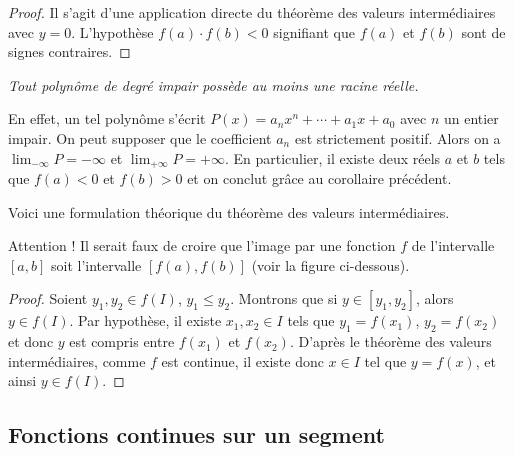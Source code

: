 \documentclass[class=report,crop=false]{standalone}
\begin{document}


\begin{proof}
Il s'agit d'une application directe du théorème des valeurs intermédiaires avec $y=0$.
L'hypothèse $f(a)\cdot f(b)<0$ signifiant que $f(a)$ et $f(b)$ sont de signes contraires.
\end{proof}

\begin{exemple}
\emph{Tout polynôme de degré impair possède au moins une racine réelle.}



En effet, un tel polynôme s'écrit $P(x)=a_nx^n+\cdots+a_1x+a_0$ avec $n$ un entier impair.
On peut supposer que le coefficient $a_n$ est strictement positif. Alors on a
$\displaystyle\lim_{-\infty} P = -\infty$ et $\displaystyle\lim_{+\infty} P = +\infty$.
En particulier, il existe deux réels $a$ et $b$ tels que $f(a)<0$ et $f(b)>0$ et
on conclut grâce au corollaire précédent.
\end{exemple}

Voici une formulation théorique du théorème des valeurs intermédiaires.
\begin{corollaire}\sauteligne
{}
\end{corollaire}

Attention ! Il serait faux de croire que l'image par une fonction $f$ de l'intervalle $[a,b]$
soit l'intervalle $[f(a),f(b)]$ (voir la figure ci-dessous).


\begin{proof}
Soient $y_1,y_2\in f(I)$, $y_1\leq y_2$. Montrons que si $y\in[y_1,y_2]$, alors $y\in f(I)$.
Par hypothèse, il existe $x_1,x_2\in I$ tels que $y_1 =f(x_1)$, $y_2 =f(x_2)$ et donc $y$
est compris entre $f(x_1)$ et $f(x_2)$. D'après le théorème des valeurs intermédiaires,
comme $f$ est continue, il existe donc $x\in I$ tel que $y=f(x)$, et ainsi $y\in f(I)$.
\end{proof}

\subsection{Fonctions continues sur un segment}
\end{document}
